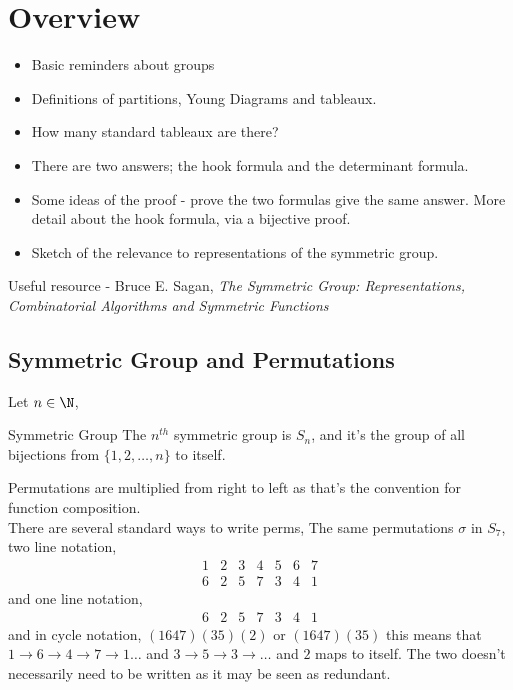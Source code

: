 \documentclass{article}
\begin{document}
  \maketitle
{}

\section{Overview}

\begin{itemize}
  \item Basic reminders about groups
  \item Definitions of partitions, Young Diagrams and tableaux.
  \item How many standard tableaux are there?
  \item There are two answers; the hook formula and the determinant formula.
  \item Some ideas of the proof - prove the two formulas give the same answer. More detail about the hook formula, via a bijective proof.
  \item Sketch of the relevance to representations of the symmetric group.
\end{itemize}

Useful resource - Bruce E. Sagan, \textit{The Symmetric Group: Representations, Combinatorial Algorithms and Symmetric Functions}

\subsection{Symmetric Group and Permutations}
Let $n \in \N$,

\begin{ndefi}{Symmetric Group}
  The $n^{th}$ symmetric group is $S_n$, and it's the group of all bijections from $\{1, 2, \dots, n\}$ to itself.
\end{ndefi}

Permutations are multiplied from right to left as that's the convention for function composition.\\
There are several standard ways to write perms,
The same permutations $\sigma$ in $S_7$, two line notation,
$$ \begin{matrix}
  1 & 2 & 3 & 4 & 5 & 6 & 7 \\
  6 & 2 & 5 & 7 & 3 & 4 & 1
\end{matrix} $$
and one line notation,
$$ \begin{matrix}
  6 & 2 & 5 & 7 & 3 & 4 & 1
\end{matrix} $$
and in cycle notation,
$ (1 6 4 7)(3 5)(2) $ or $ (1 6 4 7)(3 5) $
this means that $1 \to 6 \to 4 \to 7 \to 1 \dots$ and $3 \to 5 \to 3 \to \dots$ and $2$ maps to itself. The two doesn't necessarily need to be written as it may be seen as redundant.\\
\end{document}
